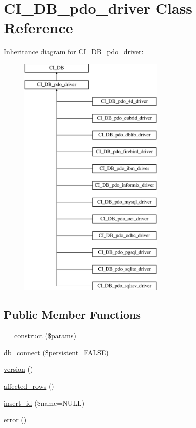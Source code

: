 \hypertarget{class_c_i___d_b__pdo__driver}{}\section{C\+I\+\_\+\+D\+B\+\_\+pdo\+\_\+driver Class Reference}
\label{class_c_i___d_b__pdo__driver}
Inheritance diagram for C\+I\+\_\+\+D\+B\+\_\+pdo\+\_\+driver\+:\begin{figure}[H]
\begin{center}
\leavevmode
\includegraphics[height=12.000000cm]{class_c_i___d_b__pdo__driver}
\end{center}
\end{figure}
\subsection*{Public Member Functions}
\begin{DoxyCompactItemize}
\item 
\mbox{\hyperlink{class_c_i___d_b__pdo__driver_a35e51848ac2748becec85f5058e1aebe}{\+\_\+\+\_\+construct}} (\$params)
\item 
\mbox{\hyperlink{class_c_i___d_b__pdo__driver_afe7bc54d09d1a90059fdcb2c6fc34d7c}{db\+\_\+connect}} (\$persistent=F\+A\+L\+SE)
\item 
\mbox{\hyperlink{class_c_i___d_b__pdo__driver_a3feb4c1f36c41a67263c7522654fdc2d}{version}} ()
\item 
\mbox{\hyperlink{class_c_i___d_b__pdo__driver_aa61ee0a06d52ca8acf3d6097044ef684}{affected\+\_\+rows}} ()
\item 
\mbox{\hyperlink{class_c_i___d_b__pdo__driver_aa3310248982b74638201f09982085a59}{insert\+\_\+id}} (\$name=N\+U\+LL)
\item 
\mbox{\hyperlink{class_c_i___d_b__pdo__driver_ad0486e6eae22694fc0e9ebe875381cf3}{error}} ()
\end{DoxyCompactItemize}
